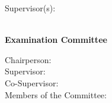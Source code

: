 \begin{titlepage}
\begin{center}
\begin{minipage}[t]{.5\textwidth}
  \begin{flushright}
    {\large Supervisor(s):\:}
  \end{flushright}
\end{minipage}%
\begin{minipage}[t]{.5\textwidth}
  \begin{flushleft}
    {\Supervisors}
  \end{flushleft}
\end{minipage}\\
%
\if{}
  \vspace*{\finalAdvisorsSpacing}
\else
  \vspace*{\draftAdvisorsSpacing}
\fi
\if{}
%
{\Large \textbf{Examination Committee}}\\[.25cm]
\begin{minipage}[t]{.5\textwidth}
  \begin{flushright}
    \if{}
    {\large Chairperson:\:}\\
    \fi
    {\large Supervisor:\:}\\
    \if{}
    {\large Co-Supervisor:\:}\\
    \fi
    \if{}
    {\large Members of the Committee:\:}
    \fi
  \end{flushright}
\end{minipage}%
\begin{minipage}[t]{.5\textwidth}
  \begin{flushleft}
    \if{}
    {\Chairperson}\\
    \fi
    {\Advisor}\\
    \if{}
    {\CoAdvisor}\\
    \fi
    \if{}
    {\CommitteeMembers}
    \fi
  \end{flushleft}
\end{minipage}\\[1.0cm]
%
\fi

\if{}
 \vspace*{\dateSpacing}
\fi

{\Large \textbf{\Month\:\Year}}\\
\end{center}
\end{titlepage}
